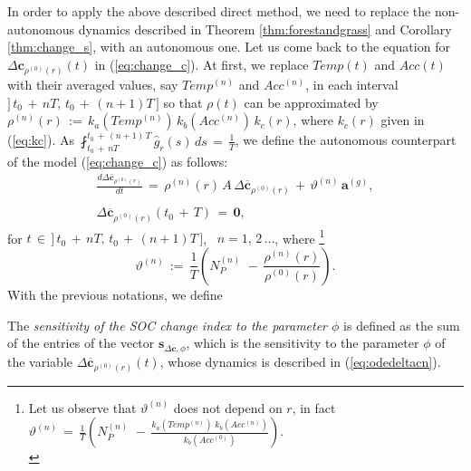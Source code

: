 \noindent In order to apply the above described direct method, we need to replace the non-autonomous dynamics described in Theorem \ref{thm:forestandgrass} and Corollary \ref{thm:change_s}, with an autonomous one. Let us come back to the equation for $\Delta \mathbf{c}_{\rho^{(0)}(r)}(t)$ in (\ref{eq:change_c}). At first, we replace $Temp(t)$ and $Acc(t)$ with their averaged  values, say $Temp^{(n)}$ and $Acc^{(n)}$, in each interval $]\,t_0\,+\,nT,\, t_0\,+\,(n+1)T\,]$ so that  $\rho(t)$ can be approximated by  
$\rho^{(n)}(r)\, :=\,k_a( Temp^{(n)})\, k_b( Acc^{(n)}) \, k_c(r)$, where $k_c(r)$  given in (\ref{eq:kc}). As  $\displaystyle \fint_{t_0\,+\,nT}^{t_0\,+\,(n+1)\,T}  \hat g_r(s)\,ds\, =\, \displaystyle \frac{1}{T}$, we define the autonomous counterpart of the model (\ref{eq:change_c}) as follows:
\begin{equation}\label{eq:odedeltacn}
\begin{array}{l}
\displaystyle \frac{d\Delta \mathbf{\overline c}_{\rho^{(0)}(r)}}{dt}\, =\,
\rho^{(n)}(r)\,  A \, \Delta \mathbf{\overline c}_{\rho^{(0)}(r)}\,+\,\vartheta^{(n)}\,  \mathbf{a}^{(g)}, \\ \\ \Delta \mathbf{\overline c}_{\rho^{(0)}(r)}(t_0\,+\,T)\,=\,\mathbf{0},
\end{array}
\end{equation}
for $t\, \in \, ]\,t_0\,+\,nT,\, t_0\,+\,(n+1)T\,]$, \, $n=1,\, 2\, \dots$,
where \footnote{Let us observe that $ \vartheta^{(n)}$ does not depend on $r$, in fact $\vartheta^{(n)}\,= \,\frac{1}{T}\left(   N_P^{(n)}\, \,-\, \frac{k_a(Temp^{(n)})\;k_b(Acc^{(n)})}{k_b(Acc^{(0)})} \right)  $. \\}\\ 
\begin{equation}\label{def:vartheta}
    \vartheta^{(n)}\,:= \,\displaystyle \frac{1}{T}\left( N_P^{(n)} \, \,-\, \displaystyle \frac{\rho^{(n)}(r)}{\rho^{(0)}(r)} \right).  
\end{equation}
\noindent With the previous notations, we define
\begin{definition}\label{sensitivity_SOC}
The {\it sensitivity of the SOC change index to the parameter $\phi$} is defined as the sum of the entries of the vector 
 $\mathbf{s}_{\Delta \mathbf{\overline c},\phi}$, which is the sensitivity to the parameter $\phi$  of the variable $\Delta \mathbf{\overline c}_{\rho^{(0)}(r)}(t)$, whose dynamics is described in (\ref{eq:odedeltacn}).
\end{definition}





